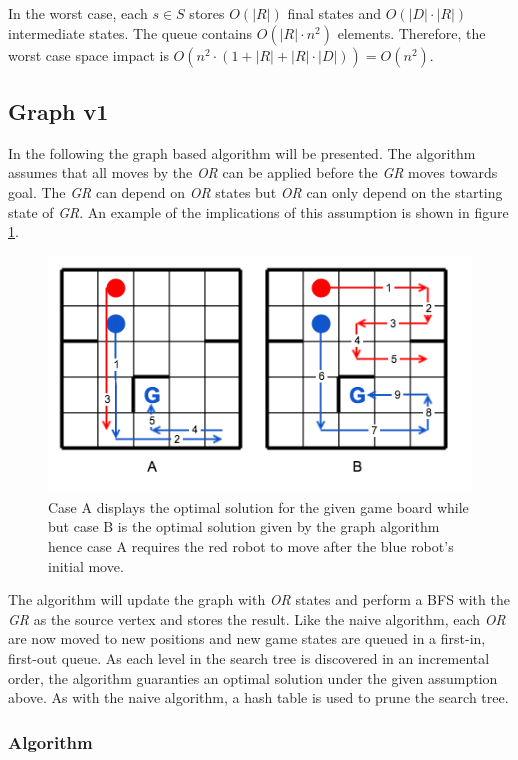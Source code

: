 \documentclass[]{article}
\begin{document}
In the worst case, each \(s \in S\) stores \(O(|R|)\) final states and
\(O(|D| \cdot |R|)\) intermediate states. The queue contains
\(O(|R| \cdot n^2)\) elements. Therefore, the worst case space impact is
\(O(n^2 \cdot(1 + |R| + |R| \cdot |D|)) = O(n^2)\).

\subsection{Graph v1}\label{graph-v1}

In the following the graph based algorithm will be presented. The
algorithm assumes that all moves by the \emph{OR} can be applied before
the \emph{GR} moves towards goal. The \emph{GR} can depend on \emph{OR}
states but \emph{OR} can only depend on the starting state of \emph{GR}.
An example of the implications of this assumption is shown in figure
\ref{fig:graph_cases}.

\begin{figure}[htb]
\centering
\includegraphics[width=0.6\linewidth]{img/graph_cases.png}
\caption{Case A displays the optimal solution for the given game board while but case B is the optimal solution given by the graph algorithm hence case A requires the red robot to move after the blue robot's initial move.}
\label{fig:graph_cases}
\end{figure}

The algorithm will update the graph with \emph{OR} states and perform a
BFS with the \emph{GR} as the source vertex and stores the result. Like
the naive algorithm, each \emph{OR} are now moved to new positions and
new game states are queued in a first-in, first-out queue. As each level
in the search tree is discovered in an incremental order, the algorithm
guaranties an optimal solution under the given assumption above. As with
the naive algorithm, a hash table is used to prune the search tree.

\subsubsection{Algorithm}\label{algorithm-1}
\end{document}
